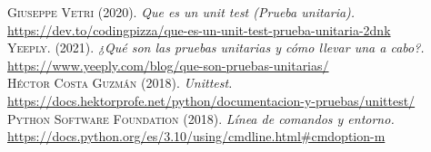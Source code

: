 \documentclass[conference]{IEEEtran}
\begin{document}



\normalsize

\begin{thebibliography}{}


 \textsc{Giuseppe Vetri} (2020). \textit{Que es un unit test (Prueba unitaria).} \url{https://dev.to/codingpizza/que-es-un-unit-test-prueba-unitaria-2dnk}\\

 \textsc{Yeeply.} (2021). \textit{¿Qué son las pruebas unitarias y cómo llevar una a cabo?.} \url{https://www.yeeply.com/blog/que-son-pruebas-unitarias/} \\

 \textsc{Héctor Costa Guzmán} (2018). \textit{Unittest.} \url{https://docs.hektorprofe.net/python/documentacion-y-pruebas/unittest/} \\

 \textsc{Python Software Foundation} (2018). \textit{Línea de comandos y entorno.} \url{https://docs.python.org/es/3.10/using/cmdline.html#cmdoption-m} \\



\end{thebibliography}
\end{document}
